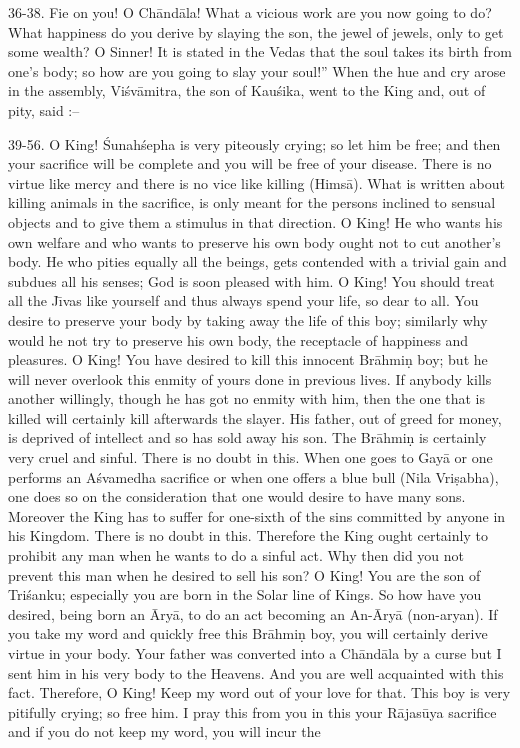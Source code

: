 36-38. Fie on you! O Ch\=and\=ala! What a vicious work are you now going to do? What happiness do you derive by slaying the son, the jewel of jewels, only to get some wealth? O Sinner! It is stated in the Vedas that the soul takes its birth from one's body; so how are you going to slay your soul!'' When the hue and cry arose in the assembly, Vi\'sv\=amitra, the son of Kau\'sika, went to the King and, out of pity, said :--

39-56. O King! \'Sunah\'sepha is very piteously crying; so let him be free; and then your sacrifice will be complete and you will be free of your disease. There is no virtue like mercy and there is no vice like killing (Hims\=a). What is written about killing animals in the sacrifice, is only meant for the persons inclined to sensual objects and to give them a stimulus in that direction. O King! He who wants his own welfare and who wants to preserve his own body ought not to cut another's body. He who pities equally all the beings, gets contended with a trivial gain and subdues all his senses; God is soon pleased with him. O King! You should treat all the J\={\i}vas like yourself and thus always spend your life, so dear to all. You desire to preserve your body by taking away the life of this boy; similarly why would he not try to preserve his own body, the receptacle of happiness and pleasures. O King! You have desired to kill this innocent Br\=ahmi\d{n} boy; but he will never overlook this enmity of yours done in previous lives. If anybody kills another willingly, though he has got no enmity with him, then the one that is killed will certainly kill afterwards the slayer. His father, out of greed for money, is deprived of intellect and so has sold away his son. The Br\=ahmi\d{n} is certainly very cruel and sinful. There is no doubt in this. When one goes to Gay\=a or one performs an A\'svamedha sacrifice or when one offers a blue bull (Nila Vri\d{s}abha), one does so on the consideration that one would desire to have many sons. Moreover the King has to suffer for one-sixth of the sins committed by anyone in his Kingdom. There is no doubt in this. Therefore the King ought certainly to prohibit any man when he wants to do a sinful act. Why then did you not prevent this man when he desired to sell his son? O King! You are the son of Tri\'sanku; especially you are born in the Solar line of Kings. So how have you desired, being born an \=Ary\=a, to do an act becoming an An-\=Ary\=a (non-aryan). If you take my word and quickly free this Br\=ahmi\d{n} boy, you will certainly derive virtue in your body. Your father was converted into a Ch\=and\=ala by a curse but I sent him in his very body to the Heavens. And you are well acquainted with this fact. Therefore, O King! Keep my word out of your love for that. This boy is very pitifully crying; so free him. I pray this from you in this your R\=ajas\=uya sacrifice and if you do not keep my word, you will incur the

